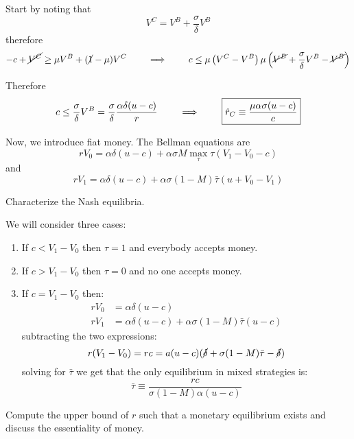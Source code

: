 \documentclass[12pt]{amsart}
\begin{document}
{{%
\begin{answer}
    Start by noting that $$V^C = V^B + \frac{\sigma}{\delta}V^B$$
   therefore $$-c + \cancel{V^C} \geq \mu V^B + (\cancel{1}-\mu) V^C \qquad \implies \qquad c\leq \mu\left(V^C - V^B\right)  \mu\left(\cancel{V^B} + \frac{\sigma}{\delta}V^B - \cancel{V^B}\right)$$
   
   Therefore 
   $$ c\leq \frac{\sigma}{\delta}V^B = \frac{\sigma}{\delta} \frac{\alpha \delta(u-c)}{r} \qquad \implies \qquad \boxed{\hat{r}_{C} \equiv \frac{\mu \alpha \sigma(u-c)}{c} }$$
\end{answer}

\begin{exercise}
    Now, we introduce fiat money. The Bellman equations are
    $$
        r V_{0}=\alpha \delta(u-c)+\alpha \sigma M \max _{\tau} \tau\left(V_{1}-V_{0}-c\right)
    $$
    and
    $$
        r V_{1}=\alpha \delta(u-c)+\alpha \sigma(1-M) \bar{\tau}\left(u+V_{0}-V_{1}\right)
    $$
\end{exercise}

\begin{subexercise}
    Characterize the Nash equilibria.
\end{subexercise}

\begin{answer}
    We will consider three cases:
\begin{enumerate}
    \item If $c < V_1 - V_0$ then $\tau = 1$ and everybody accepts money.
    \item If $c > V_1 - V_0$ then $\tau = 0$ and no one accepts money.
    \item If $c = V_1 - V_0$ then:
    \begin{align*}
        r V_0 &= \alpha \delta (u-c) \\
        r V_1 &= \alpha \delta(u-c)+\alpha \sigma(1-M) \bar{\tau}\left(u-c\right)
    \end{align*}
    subtracting the two expressions:
    $$r(V_1 - V_0) = r c = a(u-c)(\cancel{\delta} + \sigma(1-M)\bar{\tau} - \cancel{\delta})$$
    solving for $\bar{\tau}$ we get that the only equilibrium in mixed strategies is:
    $$\bar{\tau} \equiv \frac{r c}{\sigma (1-M)\alpha (u-c)}$$
\end{enumerate}
\end{answer}

\begin{subexercise}
    Compute the upper bound of $r$ such that a monetary equilibrium exists and discuss the essentiality of money.
\end{subexercise}

}}
\end{document}
